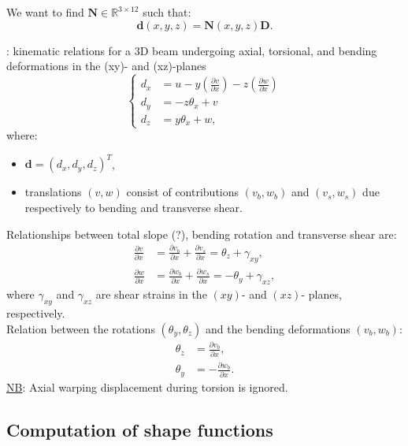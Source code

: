 \documentclass[a4paper,11pt]{article}
\newcommand{\R}{\mathbb{R}}
\newcommand{\bd}{\mathbf{d}}
\newcommand{\bD}{\mathbf{D}}
\newcommand{\bN}{\mathbf{N}}
\newcommand{\gr}{\textbf}
\begin{document}
We want to find $\bN \in \R^{3\times12}$ such that:
\begin{equation} \label{eq:d_expr}
	\bd(x,y,z) = \bN(x,y,z)\bD.
\end{equation}

\cite{Baz03}: kinematic relations for a 3D beam undergoing axial, torsional, and
bending deformations in the (xy)- and (xz)-planes
\begin{equation} \label{eq:displacement}
\left\{
	\begin{aligned}
		d_x & = u - y \left(\frac{\partial v}{\partial x}\right) - z \left(\frac{\partial w}{\partial x}\right) \\
		d_y & = -z\theta_x + v \\
		d_z & = y\theta_x + w,
	\end{aligned}
\right.
\end{equation}
where:
\begin{itemize}[label=$\gr{-}$, font=\LARGE, font=\color{black}, topsep = 0.2cm,
itemsep=0.2cm]
	\item $\bd = (d_x, d_y, d_z)^T$,
	\item translations $(v, w)$ consist of contributions $(v_b, w_b)$ and $(v_s,
w_s)$ due respectively to bending and transverse shear.\\
\end{itemize}

Relationships between total slope (?), bending rotation and transverse shear are:
\begin{align}
\frac{\partial v}{\partial x} & = \frac{\partial v_b}{\partial x} + \frac{\partial v_s}{\partial x} = \theta_z + \gamma_{xy}, \label{eq:dv_dx}\\
\frac{\partial w}{\partial x} & = \frac{\partial w_b}{\partial x} + \frac{\partial w_s}{\partial x} = -\theta_y + \gamma_{xz}, \label{eq:dw_dx}
\end{align}
where $\gamma_{xy}$ and $\gamma_{xz}$ are shear strains in the $(xy)$- and $(xz)$-
planes, respectively.\\
Relation between the rotations $(\theta_y, \theta_z)$ and the bending deformations
$(v_b, w_b)$:
\begin{align}
\theta_z & = \frac{\partial v_b}{\partial x}, \label{eq:theta_z_dv_dx} \\
\theta_y & = - \frac{\partial w_b}{\partial x}. \label{eq:theta_y_dw_dx}
\end{align}
\underline{NB}: Axial warping displacement during torsion is ignored.

\subsection*{Computation of shape functions}
\end{document}
